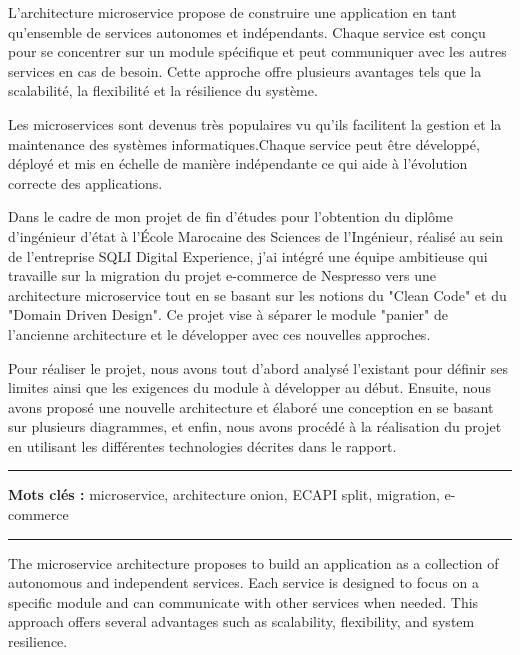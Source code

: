 

\par L'architecture microservice propose de construire une application en tant qu'ensemble de services autonomes et indépendants. Chaque service est conçu pour se concentrer sur un module spécifique et peut communiquer avec les autres services en cas de besoin. Cette approche offre plusieurs avantages tels que la scalabilité, la flexibilité et la résilience du système. 

\par Les microservices sont devenus très populaires vu qu'ils facilitent la gestion et la maintenance des systèmes informatiques.Chaque service peut être développé, déployé et mis en échelle de manière indépendante ce qui aide à l'évolution correcte des applications.


\par Dans le cadre de mon projet de fin d’études pour l’obtention du diplôme d'ingénieur d'état à l’École Marocaine des Sciences de l'Ingénieur, réalisé au sein de l’entreprise SQLI Digital Experience, j’ai intégré une équipe ambitieuse qui travaille sur la migration du projet e-commerce de Nespresso vers une architecture microservice tout en se basant  sur les notions du "Clean Code" et du "Domain Driven Design". Ce projet vise à séparer le module "panier" de l'ancienne architecture et le développer avec ces nouvelles approches.


\par Pour réaliser le projet, nous avons tout d’abord analysé l'existant pour définir ses limites ainsi que les exigences du module à développer au début. Ensuite, nous avons proposé une nouvelle architecture et élaboré une conception en se basant sur plusieurs diagrammes, et enfin, nous avons procédé à la réalisation du projet en utilisant les différentes technologies décrites dans le rapport.

\vspace{1cm}


\noindent\rule[2pt]{\textwidth}{0.5pt}

{\textbf{Mots clés :}}
microservice, architecture onion, ECAPI split, migration, e-commerce


\noindent\rule[2pt]{\textwidth}{0.5pt}

\clearpage

The microservice architecture proposes to build an application as a collection of autonomous and independent services. Each service is designed to focus on a specific module and can communicate with other services when needed. This approach offers several advantages such as scalability, flexibility, and system resilience.


